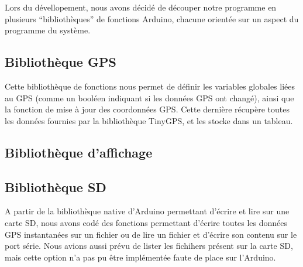 \documentclass[a4paper,12pt]{article}
\begin{document}
Lors du dévellopement, nous avons décidé de découper notre programme en plusieurs ``bibliothèques'' de fonctions Arduino, chacune orientée sur un aspect du programme du système.
\subsection{Bibliothèque GPS}
Cette bibliothèque de fonctions nous permet de définir les variables globales liées au GPS (comme un booléen indiquant si les données GPS ont changé), ainsi que la fonction de mise à jour des coordonnées GPS. Cette dernière récupère toutes les données fournies par la bibliothèque TinyGPS, et les stocke dans un tableau.
\subsection{Bibliothèque d'affichage}
\subsection{Bibliothèque SD}
A partir de la bibliothèque native d'Arduino permettant d'écrire et lire sur une carte SD, nous avons codé des fonctions permettant d'écrire toutes les données GPS instantanées sur un fichier ou de lire un fichier et d'écrire son contenu sur le port série. Nous avions aussi prévu de lister les fichihers présent sur la carte SD, mais cette option n'a pas pu être implémentée faute de place sur l'Arduino.
\end{document}
